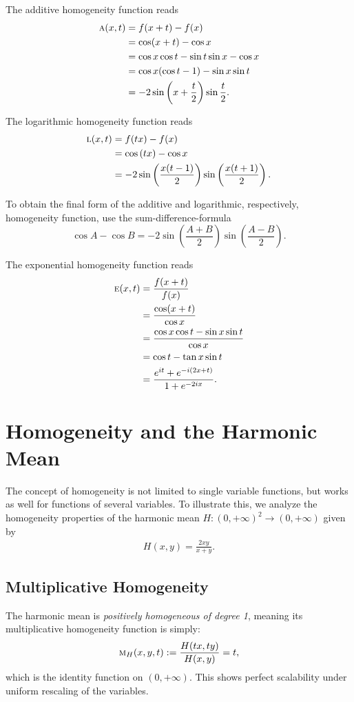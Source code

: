 \documentclass{amsart}
\theoremstyle{plain}
\numberwithin{equation}{section}
\newcommand{\eh}{\textsc{e}}
\begin{document}
The additive homogeneity function reads
\begin{align*}
\textsc{a}(x,t)&=f(x+t)-f(x)\\
&={\cos(x+t)}-{\cos{x}}\\
&=\cos{x} \cos{t}-\sin{t}\sin{x}-\cos{x}\\
&= \cos{x} (\cos{t}-1)- \sin{x} \sin{t}\\
&= -2 \sin{\left(x+\frac{t}{2}\right)} \sin{\frac{t}{2}}.
\end{align*}

The logarithmic homogeneity function reads
\begin{align*}
\textsc{l}(x,t)&=f(tx)-f(x)\\
&=
\cos{(tx)}-\cos{x}\\
&=
-2 \sin\left(\frac{x (t-1)}{2}\right) 
\sin\left(\frac{x (t+1)}{2}\right).
\end{align*}

To obtain the final form of the additive and logarithmic, respectively, homogeneity function, use the sum-difference-formula
\begin{equation*}
\cos{A}-\cos{B}
=
-2\sin{\left(\frac{A+B}{2}\right)}
\sin{\left(\frac{A-B}{2}\right)}. 
\end{equation*}


The exponential homogeneity function reads
\begin{align*}
\eh(x,t)&=\frac{f(x+t)}{f(x)}\\
&=\frac{\cos(x+t)}{\cos{x}}\\
&=\frac{\cos{x}\cos{t} - \sin{x} \sin{t}}{\cos{x}}\\
&= \cos{t}- \tan{x} \sin{t} \\
&=\frac{e^{i t} + e^{- i (2x+t)}}{1 + e^{- 2i x }}.\\
\end{align*}

\section{Homogeneity and the Harmonic Mean}
The concept of homogeneity is not limited to single variable functions,
but works as well for functions of several variables.
%
To illustrate this, we analyze the homogeneity properties of the harmonic mean
$H: (0,+\infty)^2 \to (0,+\infty)$ given by
\begin{align*}
H(x,y) = \frac{2xy}{x+y}.
\end{align*}

\subsection{Multiplicative Homogeneity}
The harmonic mean is \emph{positively homogeneous of degree 1}, meaning its multiplicative homogeneity function is simply:
\begin{align*}
\textsc{m}_H(x,y,t) := \frac{H(tx,ty)}{H(x,y)} = t,
\end{align*}
which is the identity function on $(0, +\infty)$. 
This shows perfect scalability under uniform rescaling of the variables.
\end{document}
